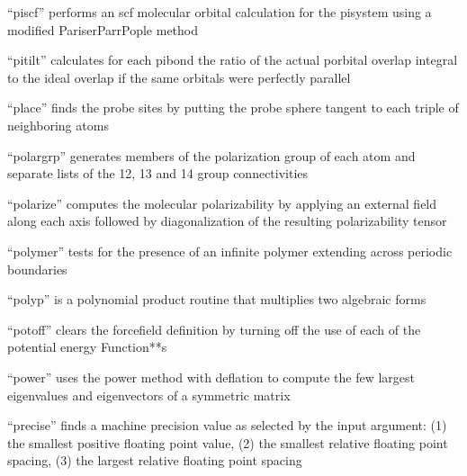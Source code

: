\documentclass[letterpaper,11pt,english]{sphinxmanual}
\begin{document}

“piscf” performs an scf molecular orbital calculation for the pisystem using a modified Pariser\sphinxhyphen{}Parr\sphinxhyphen{}Pople method


“pitilt” calculates for each pibond the ratio of the actual p\sphinxhyphen{}orbital overlap integral to the ideal overlap if the same orbitals were perfectly parallel


“place” finds the probe sites by putting the probe sphere tangent to each triple of neighboring atoms


“polargrp” generates members of the polarization group of each atom and separate lists of the 1\sphinxhyphen{}2, 1\sphinxhyphen{}3 and 1\sphinxhyphen{}4 group connectivities


“polarize” computes the molecular polarizability by applying an external field along each axis followed by diagonalization of the resulting polarizability tensor


“polymer” tests for the presence of an infinite polymer extending across periodic boundaries


“polyp” is a polynomial product routine that multiplies two algebraic forms



“potoff” clears the forcefield definition by turning off the use of each of the potential energy Function**s


“power” uses the power method with deflation to compute the few largest eigenvalues and eigenvectors of a symmetric matrix


“precise” finds a machine precision value as selected by the input argument: (1) the smallest positive floating point value, (2) the smallest relative floating point spacing, (3) the largest relative floating point spacing
\end{document}

